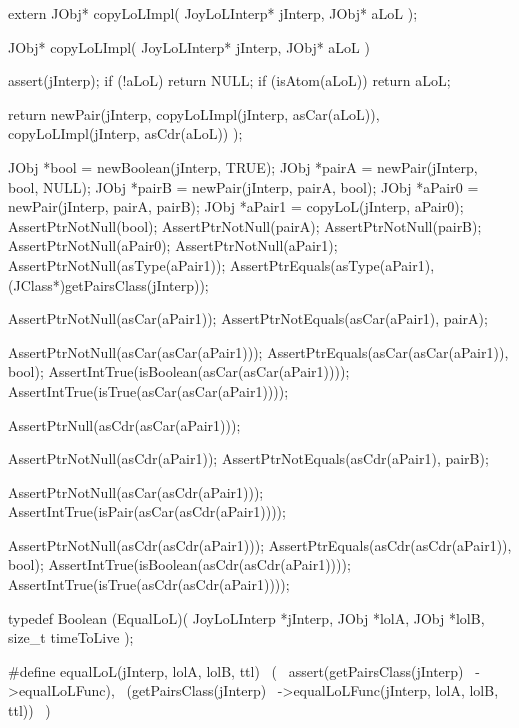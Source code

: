 \startCHeader
extern JObj* copyLoLImpl(
  JoyLoLInterp* jInterp,
  JObj* aLoL
);
\stopCHeader
{}

\startCCode
JObj* copyLoLImpl(
  JoyLoLInterp* jInterp,
  JObj* aLoL
) {
  assert(jInterp);
  if (!aLoL) return NULL;
  if (isAtom(aLoL)) return aLoL;

  return newPair(jInterp,
                 copyLoLImpl(jInterp, asCar(aLoL)),
                 copyLoLImpl(jInterp, asCdr(aLoL))
                 );
}
\stopCCode


\startCTest
  JObj *bool   = newBoolean(jInterp, TRUE);
  JObj *pairA  = newPair(jInterp, bool, NULL);
  JObj *pairB  = newPair(jInterp, pairA, bool);
  JObj *aPair0 = newPair(jInterp, pairA, pairB);
  JObj *aPair1 = copyLoL(jInterp, aPair0);
  AssertPtrNotNull(bool);
  AssertPtrNotNull(pairA);
  AssertPtrNotNull(pairB);
  AssertPtrNotNull(aPair0);
  AssertPtrNotNull(aPair1);
  AssertPtrNotNull(asType(aPair1));
  AssertPtrEquals(asType(aPair1),
    (JClass*)getPairsClass(jInterp));

  AssertPtrNotNull(asCar(aPair1));
  AssertPtrNotEquals(asCar(aPair1), pairA);

  AssertPtrNotNull(asCar(asCar(aPair1)));
  AssertPtrEquals(asCar(asCar(aPair1)), bool);
  AssertIntTrue(isBoolean(asCar(asCar(aPair1))));
  AssertIntTrue(isTrue(asCar(asCar(aPair1))));

  AssertPtrNull(asCdr(asCar(aPair1)));

  AssertPtrNotNull(asCdr(aPair1));
  AssertPtrNotEquals(asCdr(aPair1), pairB);

  AssertPtrNotNull(asCar(asCdr(aPair1)));
  AssertIntTrue(isPair(asCar(asCdr(aPair1))));

  AssertPtrNotNull(asCdr(asCdr(aPair1)));
  AssertPtrEquals(asCdr(asCdr(aPair1)), bool);
  AssertIntTrue(isBoolean(asCdr(asCdr(aPair1))));
  AssertIntTrue(isTrue(asCdr(asCdr(aPair1))));
\stopCTest
\stopTestCase
\stopTestSuite

\startTestSuite[equalLoL]

\startCHeader
typedef Boolean (EqualLoL)(
  JoyLoLInterp *jInterp,
  JObj         *lolA,
  JObj         *lolB,
  size_t        timeToLive
);

#define equalLoL(jInterp, lolA, lolB, ttl)      \
  (                                             \
    assert(getPairsClass(jInterp)               \
      ->equalLoLFunc),                          \
    (getPairsClass(jInterp)                     \
      ->equalLoLFunc(jInterp, lolA, lolB, ttl)) \
  )

